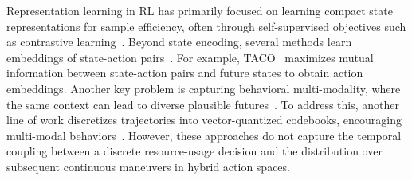 Representation learning in RL has primarily focused on learning compact state representations for sample efficiency, often through self-supervised objectives such as contrastive learning~\cite{allshire2021laser, biza2025robot, oord2018representation}.
Beyond state encoding, several methods learn embeddings of state-action pairs~\cite{allshire2021laser, zheng2023taco}.
For example, TACO~\cite{zheng2023taco} maximizes mutual information between state-action pairs and future states to obtain action embeddings.
Another key problem is capturing behavioral multi-modality, where the same context can lead to diverse plausible futures~\cite{zhu2023imitation}.
To address this, another line of work discretizes trajectories into vector-quantized codebooks, encouraging multi-modal behaviors~\cite{luo2023action, van2017neural}.
However, these approaches do not capture the temporal coupling between a discrete resource-usage decision and the distribution over subsequent continuous maneuvers in hybrid action spaces.